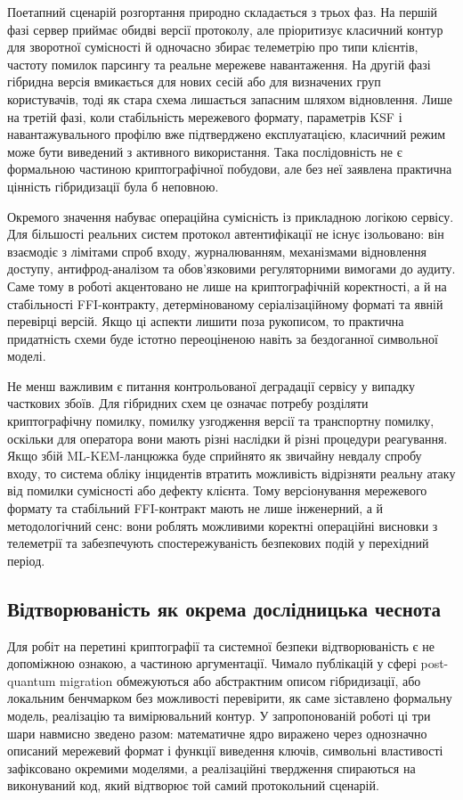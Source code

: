 \documentclass{llncs}
\begin{document}
Поетапний сценарій розгортання природно складається з трьох фаз. На
першій фазі сервер приймає обидві версії протоколу, але пріоритизує
класичний контур для зворотної сумісності й одночасно збирає телеметрію
про типи клієнтів, частоту помилок парсингу та реальне мережеве
навантаження. На другій фазі гібридна версія вмикається для нових сесій
або для визначених груп користувачів, тоді як стара схема лишається
запасним шляхом відновлення. Лише на третій фазі, коли стабільність
мережевого формату, параметрів KSF і навантажувального профілю вже
підтверджено експлуатацією, класичний режим може бути виведений з
активного використання. Така послідовність не є формальною частиною
криптографічної побудови, але без неї заявлена практична цінність
гібридизації була б неповною.

Окремого значення набуває операційна сумісність із прикладною логікою
сервісу. Для більшості реальних систем протокол автентифікації не існує
ізольовано: він взаємодіє з лімітами спроб входу, журналюванням,
механізмами відновлення доступу, антифрод-аналізом та обов'язковими
регуляторними вимогами до аудиту. Саме тому в роботі акцентовано не
лише на криптографічній коректності, а й на стабільності FFI-контракту,
детермінованому серіалізаційному форматі та явній перевірці версій.
Якщо ці аспекти лишити поза рукописом, то практична придатність схеми
буде істотно переоціненою навіть за бездоганної символьної моделі.

Не менш важливим є питання контрольованої деградації сервісу у випадку
часткових збоїв. Для гібридних схем це означає потребу розділяти
криптографічну помилку, помилку узгодження версії та транспортну
помилку, оскільки для оператора вони мають різні наслідки й різні
процедури реагування. Якщо збій ML-KEM-ланцюжка буде сприйнято як
звичайну невдалу спробу входу, то система обліку інцидентів втратить
можливість відрізняти реальну атаку від помилки сумісності або дефекту
клієнта. Тому версіонування мережевого формату та стабільний FFI-контракт
мають не лише інженерний, а й методологічний сенс: вони роблять
можливими коректні операційні висновки з телеметрії та забезпечують
спостережуваність безпекових подій у перехідний період.

\subsection{Відтворюваність як окрема дослідницька чеснота}

Для робіт на перетині криптографії та системної безпеки відтворюваність
є не допоміжною ознакою, а частиною аргументації. Чимало публікацій у
сфері post-quantum migration обмежуються або абстрактним описом
гібридизації, або локальним бенчмарком без можливості перевірити, як
саме зіставлено формальну модель, реалізацію та вимірювальний контур.
У запропонованій роботі ці три шари навмисно зведено разом: математичне
ядро виражено через однозначно описаний мережевий формат і функції
виведення ключів, символьні властивості зафіксовано окремими моделями,
а реалізаційні твердження спираються на виконуваний код, який відтворює
той самий протокольний сценарій.
\end{document}
